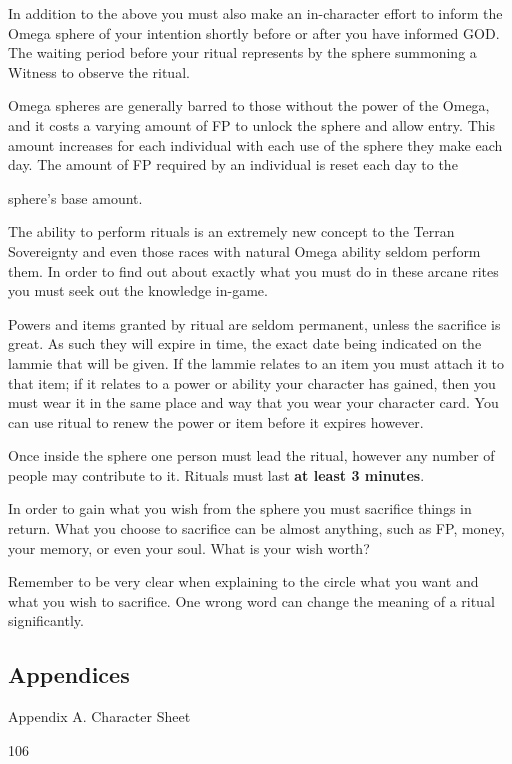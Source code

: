 \documentclass{scrbook}
\begin{document}
In addition to the above you must also make an in-character effort to inform the Omega sphere of your intention shortly before or after you have informed GOD. The waiting period before your ritual represents by the sphere summoning a Witness to observe the ritual.

Omega spheres are generally barred to those without the power of the Omega, and it costs a varying amount of FP to unlock the sphere and allow entry. This amount increases for each individual with each use of the sphere they make each day. The amount of FP required by an individual is reset each day to the

sphere's base amount.

The ability to perform rituals is an extremely new concept to the Terran Sovereignty and even those races with natural Omega ability seldom perform them. In order to find out about exactly what you must do in these arcane rites you must seek out the knowledge in-game.

Powers and items granted by ritual are seldom permanent, unless the sacrifice is great. As such they will expire in time, the exact date being indicated on the lammie that will be given. If the lammie relates to an item you must attach it to that item; if it relates to a power or ability your character has gained, then you must wear it in the same place and way that you wear your character card. You can use ritual to renew the power or item before it expires however.

Once inside the sphere one person must lead the ritual, however any number of people may contribute to it. Rituals must last \textbf{at least 3 minutes}.

In order to gain what you wish from the sphere you must sacrifice things in return. What you choose to sacrifice can be almost anything, such as FP, money, your memory, or even your soul. What is your wish worth?

Remember to be very clear when explaining to the circle what you want and what you wish to sacrifice. One wrong word can change the meaning of a ritual significantly.

\subsection{Appendices}

Appendix A. Character Sheet

106
\end{document}
